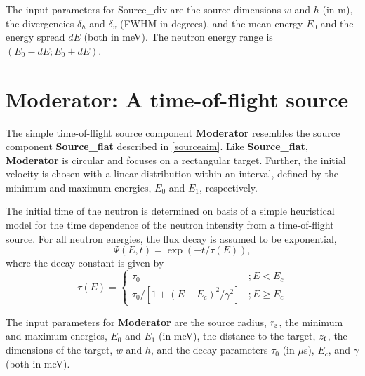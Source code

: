 The input parameters for Source\_div are the source dimensions
$w$ and $h$ (in m), the divergencies $\delta_h$ and $\delta_v$ (FWHM in degrees), 
and the mean energy $E_0$ and the energy spread $dE$ (both in meV).
The neutron energy range is $(E_0-dE; E_0+dE)$. 


\section{Moderator: A time-of-flight source}
The simple time-of-flight source component {\bf Moderator} resembles
the source component {\bf Source\_flat} described in \ref{sourceaim}.
Like {\bf Source\_flat}, {\bf Moderator} is circular and focuses
on a rectangular target. Further, the initial velocity is chosen
with a linear distribution within an interval, defined by the
minimum and maximum energies, $E_0$ and $E_1$,
respectively.

The initial time of the neutron is determined on basis of a 
simple heuristical model for the time dependence of the 
neutron intensity from a time-of-flight source.
For all neutron energies, the flux decay is assumed to be exponential,
\begin{equation}
\Psi(E,t) = \exp(-t/\tau(E)) ,
\end{equation}
where the decay constant is given by
\begin{equation}
\tau(E) = \left\{ 
\begin{array}{cc}
 \tau_0                               & ; E<E_c \\
 \tau_0 / [ 1 + (E-E_c)^2/\gamma^2 ]  & ; E \geq E_c
\end{array}
\right.
\end{equation}

The input parameters for {\bf Moderator} are the source radius, $r_{\rm s}$,
the minimum and maximum energies, $E_0$ and $E_1$ (in meV),
the distance to the target, $z_{\rm f}$, the dimensions of the target,
$w$ and $h$, and the decay parameters 
$\tau_0$ (in $\mu$s), $E_c$, and $\gamma$ (both in meV).





